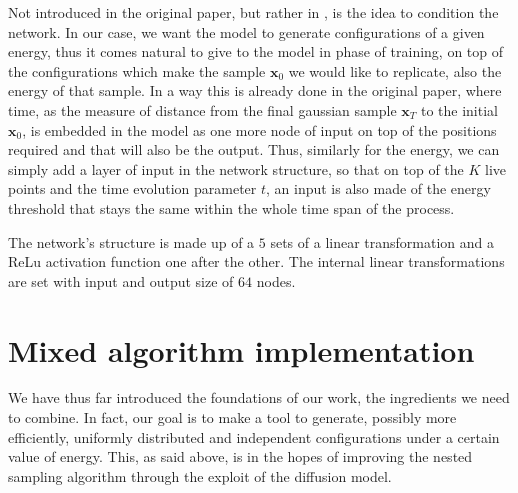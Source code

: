 \documentclass[a4paper, 12pt]{article}          %
\begin{document}
Not introduced in the original paper, but rather in \cite{Nichol2021ImprovedDDPM}, is the idea to condition the network. In our case, we want the model to generate configurations of a given energy, thus it comes natural to give to the model in phase of training, on top of the configurations which make the sample $\mathbf{x}_0$ we would like to replicate, also the energy of that sample. In a way this is already done in the original paper, where time, as the measure of distance from the final gaussian sample $\mathbf{x}_T$ to the initial $\mathbf{x}_0$, is embedded in the model as one more node of input on top of the positions required and that will also be the output. Thus, similarly for the energy, we can simply add a layer of input in the network structure, so that on top of the $K$ live points and the time evolution parameter $t$, an input is also made of the energy threshold that stays the same within the whole time span of the process.

The network's structure is made up of a $5$ sets of a linear transformation and a ReLu activation function one after the other. The internal linear transformations are set with input and output size of $64$ nodes.

 
\section{Mixed algorithm implementation} \label{sec:mixed_alg}

We have thus far introduced the foundations of our work, the ingredients we need to combine. In fact, our goal is to make a tool to generate, possibly more efficiently, uniformly distributed and independent configurations under a certain value of energy. This, as said above, is in the hopes of improving the nested sampling algorithm through the exploit of the diffusion model.
\end{document}
